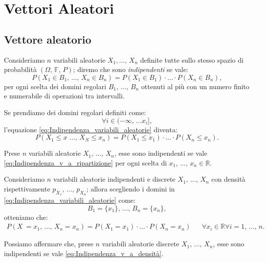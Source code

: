 
\chapter{Vettori Aleatori}
    \section{Vettore aleatorio}
        \begin{defn}
            Consideriamo $n$ variabili aleatorie $X_1, \ldots,\, X_n$ definite tutte sullo stesso spazio di probabilità $(\Omega,\,\mathbb{F},\,P)$; diremo che sono  \emph{indipendenti} se vale:
            \begin{equation}\label{eq:Indipendenza_variabili_aleatorie}
                P(X_1 \in B_1,\, \ldots,\, X_n \in B_n) = P(X_1 \in B_1) \cdot \ldots \cdot P(X_n \in B_n)
            ,\end{equation}
            per ogni scelta dei domini regolari $B_1,\, \ldots,\, B_n$ ottenuti al più con un numero finito e numerabile di operazioni tra intervalli.
        \end{defn}
        \begin{obsv}
            Se prendiamo dei domini regolari definiti come: \[
                \forall i \in (-\infty,\, \ldots x_i]
            ,\] l'equazione \eqref{eq:Indipendenza_variabili_aleatorie} diventa:
            \begin{equation}\label{eq:Indipendenza_v_a_ripartizione}
                P(X_1 \leq x\,\, \ldots,\, X_N \leq x_n) = P(X_1 \leq x_1) \cdot \ldots \cdot P(X_n \leq x_n)
            .\end{equation}
        \end{obsv}
        \begin{prty}
            Prese $n$ variabili aleatorie $X_1,\, \ldots,\, X_n$, esse sono indipendenti se vale  \eqref{eq:Indipendenza_v_a_ripartizione} per ogni scelta di $x_1,\, \ldots,\, x_n \in \mathbb{R}$.
        \end{prty}
        \begin{obsv}
            Consideriamo $n$ variabili aleatorie indipendenti e discrete $X_1,\, \ldots,\, X_n$ con densità rispettivamente $p_{X_1},\, \ldots,\, p_{X_n}$; allora scegliendo i domini in \eqref{eq:Indipendenza_variabili_aleatorie} come: \[
                B_1 = \{x_1\},\, \ldots,\, B_n = \{x_n\}
            ,\] otteniamo che:
            \begin{align}\label{eq:Indipendenza_v_a_densità}
                P(X\ = x_1,\, \ldots,\, X_n = x_n) = P(X_1 = x_1) \cdot \ldots \cdot P(X_n = x_n) & &
                \forall  x_i \in \mathbb{R} \forall i = 1,\, \ldots,\, n
            .\end{align}
        \end{obsv}
        \begin{prty}
            Possiamo affermare che, prese $n$ variabili aleatorie discrete $X_1,\, \ldots,\, X_n$, esse sono indipendenti se vale \eqref{eq:Indipendenza_v_a_densità}.
        \end{prty}
